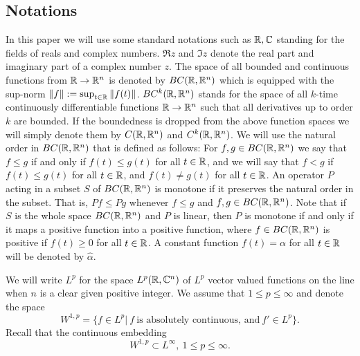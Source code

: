 \documentclass[12pt,letterpaper]{amsart}
\theoremstyle{definition}
\theoremstyle{remark}
\numberwithin{equation}{section}
\begin{document}
\subsection{Notations}
In this paper we will use some standard notations such as $\mathbb R,\mathbb C$ standing for the fields of reals and complex numbers. $\Re z$ and $\Im z$ denote the real part and imaginary part of a complex number $z$. The space of all bounded and continuous functions from $\mathbb R  \to \mathbb R^n$ is denoted by $BC(\mathbb R,\mathbb R^n)$ which is equipped with the sup-norm $\| f\| := \sup_{t\in\mathbb R} \| f(t)\|$. $BC^k(\mathbb R,\mathbb R^n)$ stands for the space of all $k$-time continuously differentiable functions $\mathbb R\to\mathbb R^n$ such that all derivatives up to order $k$ are bounded. If the boundedness is dropped from the above function spaces we will simply denote them by $C(\mathbb R,\mathbb R^n)$ and $C^k(\mathbb R,\mathbb R^n)$. We will use the natural order in $BC(\mathbb R,\mathbb R^n)$ that is defined as follows: 
For $f,g\in BC(\mathbb R,\mathbb R^n)$ we say that $f\le g$ if and only if $f(t)\le g(t)$ for all $t\in \mathbb R$, and we will say that $f< g$ if $f(t)\le g(t)$ for all $t\in \mathbb R$, and $f(t)\not= g(t)$ for all $t\in \mathbb R$.
An operator $P$ acting in a subset $S$ of $BC(\mathbb R,\mathbb R^n)$ is monotone if it preserves the natural order in the subset. That is, $Pf \le Pg$ whenever $f\le g$ and $f,g\in BC(\mathbb R,\mathbb R^n)$. Note that if $S$ is the whole space $BC(\mathbb R,\mathbb R^n)$ and $P$ is linear, then $P$ is monotone if and only if it maps a positive function into a positive function, where $f\in BC(\mathbb R,\mathbb R^n)$ is positive if $f(t)\ge 0$ for all $t\in \mathbb R$. A constant function $f(t)=\alpha$ for all $t\in \mathbb R$ will be denoted by $\hat \alpha$.

\medskip
We will write $L^p$ for the space $L^p(\mathbb R,\mathbb C^n)$ of $L^p$ vector valued functions on the line when $n$ is a clear given positive integer. We assume that $1\le p\le \infty$ and denote the space
$$
W^{1,p}=\{ f\in L^p | \ f \ \mbox{is absolutely continuous, and}\ f'\in L^p\}.
$$
Recall that the continuous embedding
$$
W^{1,p} \subset L^\infty , \ 1\le p\le \infty .
$$
\end{document}
